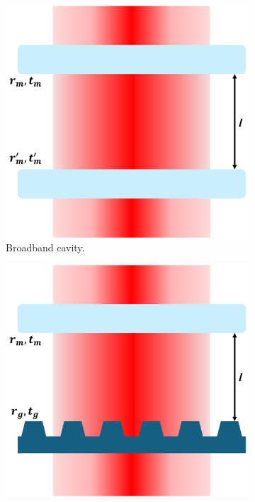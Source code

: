 \begin{figure}[h!]
    \centering
    \begin{subfigure}[b]{0.3\textwidth}
        \includegraphics[width=\textwidth]{figures/broadband_sketch.pdf}
        \caption{Broadband cavity.}
    \end{subfigure}
    \hfill
    \begin{subfigure}[b]{0.3\textwidth}
        \includegraphics[width=\textwidth]{figures/single_fano_sketch.pdf}

\end{subfigure}
\end{figure}
